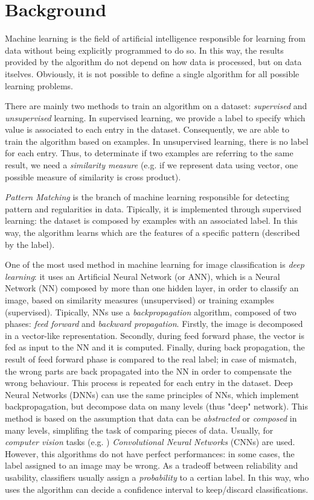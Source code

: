 \section{Background}

Machine learning is the field of artificial intelligence responsible for learning from data without being explicitly programmed to do so. In this way, the results provided by the algorithm do not depend on how data is processed, but on data itselves. Obviously, it is not possible to define a single algorithm for all possible learning problems.

There are mainly two methods to train an algorithm on a dataset: \textit{supervised} and \textit{unsupervised} learning. In supervised learning, we provide a label to specify which value is associated to each entry in the dataset. Consequently, we are able to train the algorithm based on examples. In unsupervised learning, there is no label for each entry. Thus, to determinate if two examples are referring to the same result, we need a \textit{similarity measure} (e.g. if we represent data using vector, one possible measure of similarity is cross product).

\textit{Pattern Matching} is the branch of machine learning responsible for detecting pattern and regularities in data. Tipically, it is implemented through supervised learning: the dataset is composed by examples with an associated label. In this way, the algorithm learns which are the features of a specific pattern (described by the label).

One of the most used method in machine learning for image classification is \textit{deep learning}: it uses an Artificial Neural Network (or ANN), which is a Neural Network (NN) composed by more than one hidden layer, in order to classify an image, based on similarity measures (unsupervised) or training examples (supervised). Tipically, NNs use a \textit{backpropagation} algorithm, composed of two phases: \textit{feed forward} and \textit{backward propagation}. Firstly, the image is decomposed in a vector-like representation. Secondly, during feed forward phase, the vector is fed as input to the NN and it is computed. Finally, during back propagation, the result of feed forward phase is compared to the real label; in case of mismatch, the wrong parts are back propagated into the NN in order to compensate the wrong behaviour. This process is repeated for each entry in the dataset.
Deep Neural Networks (DNNs) can use the same principles of NNs, which implement backpropagation, but decompose data on many levels (thus "deep" network). This method is based on the assumption that data can be \textit{abstracted} or \textit{composed} in many levels, simplifing the task of comparing pieces of data.
Usually, for \textit{computer vision} tasks (e.g. \cite{Handwritten}) \textit{Convolutional Neural Networks} (CNNs) are used\cite{CNN}.
However, this algorithms do not have perfect performances: in some cases, the label assigned to an image may be wrong. As a tradeoff between reliability and usability, classifiers usually assign a \textit{probability} to a certian label. In this way, who uses the algorithm can decide a confidence interval to keep/discard classifications.


